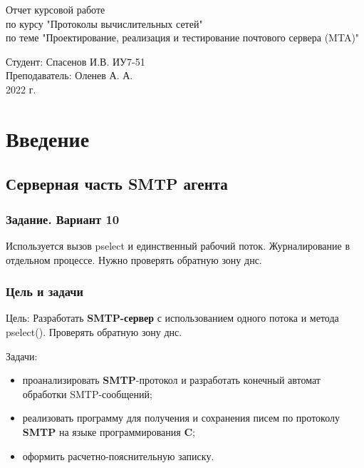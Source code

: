 \documentclass[a4paper,12pt]{report}
\begin{document}
	\begin{titlepage}
		\begin{center}
			\begin{LARGE}
				Отчет курсовой работе\\
					по курсу "Протоколы вычислительных сетей"\\
					по теме "Проектирование, реализация и тестирование почтового сервера (MTA)"
			\end{LARGE}
		
			\begin{Large}
				\vspace{5cm}
				Студент: Спасенов И.В. ИУ7-51\\
					Преподаватель: Оленев А. А. \\
				
				\vspace{10cm}2022 г.				   
			\end{Large}
			
		\end{center}
		 
	\end{titlepage}

\tableofcontents

\chapter*{Введение}

\section*{Серверная часть SMTP агента}

\subsection*{Задание. Вариант 10}

Используется вызов pselect и единственный рабочий поток. Журналирование в отдельном процессе. Нужно проверять обратную зону днс.

\subsection*{Цель и задачи}

Цель:
    Разработать \textbf{SMTP-сервер} с использованием одного потока и метода pselect(). Проверять обратную зону днс.

Задачи:
\begin{itemize}
    \item проанализировать \textbf{SMTP}-протокол и разработать конечный автомат обработки SMTP-сообщений;
    \item реализовать программу для получения и сохранения писем по протоколу \textbf{SMTP} на языке программирования \textbf{C};
    \item оформить расчетно-пояснительную записку.
\end{itemize}
\end{document}
